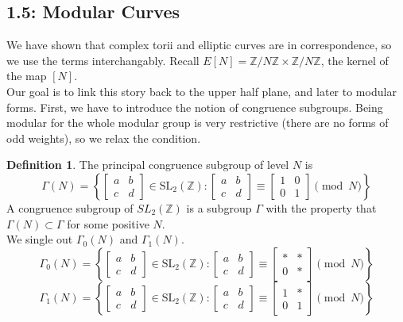 \documentclass[11pt]{article}
\theoremstyle{definition}
\newtheorem{definition}{Definition}[section]
\theoremstyle{example}
\theoremstyle{remark}
\theoremstyle{lemma}
\theoremstyle{proposition}
\theoremstyle{Problem}
\theoremstyle{Solution}
\theoremstyle{theorem}
\theoremstyle{corollary}
\begin{document}
\subsection{1.5: Modular Curves}
We have shown that complex torii and elliptic curves are in correspondence, so we use the terms interchangably. Recall $E[N] = \mathbb{Z}/N\mathbb{Z} \times \mathbb{Z}/N\mathbb{Z}$, the kernel of the map $[N]$.\\
Our goal is to link this story back to the upper half plane, and later to modular forms. First, we have to introduce the notion of congruence subgroups. Being modular for the whole modular group is very restrictive (there are no forms of odd weights), so we relax the condition.
\begin{definition}
The principal congruence subgroup of level $N$ is 
$$\Gamma(N) = \left\{\begin{bmatrix}
a & b \\
c & d
\end{bmatrix}
\in \mathrm{SL}_2(\mathbb{Z}) \colon
\begin{bmatrix}
a & b \\
c & d
\end{bmatrix}
\equiv
\begin{bmatrix}
1 & 0 \\
0 & 1
\end{bmatrix}
\pmod{N}\right\}$$
A congruence subgroup of $SL_2(\mathbb{Z})$ is a subgroup $\Gamma$ with the property that $\Gamma(N)\subset \Gamma$ for some positive $N$.\\
We single out $\Gamma_0(N)$ and $\Gamma_1(N)$.
$$\Gamma_0(N) = \left\{\begin{bmatrix}
a & b \\
c & d
\end{bmatrix}
\in \mathrm{SL}_2(\mathbb{Z}) \colon
\begin{bmatrix}
a & b \\
c & d
\end{bmatrix}
\equiv
\begin{bmatrix}
* & * \\
0 & *
\end{bmatrix}
\pmod{N}\right\}$$
$$\Gamma_1(N) = \left\{\begin{bmatrix}
a & b \\
c & d
\end{bmatrix}
\in \mathrm{SL}_2(\mathbb{Z}) \colon
\begin{bmatrix}
a & b \\
c & d
\end{bmatrix}
\equiv
\begin{bmatrix}
1 & * \\
0 & 1
\end{bmatrix}
\pmod{N}\right\}$$
\end{definition}
\end{document}
